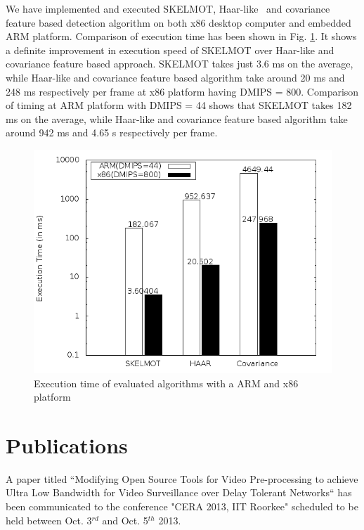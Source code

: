 \documentclass[a4paper, 12pt, twoside]{synopsis}  %
\begin{document}
\indent We have implemented and executed SKELMOT, Haar-like~\cite{17} and
covariance~\cite{19} feature based detection algorithm on both x86
desktop computer and embedded ARM platform. Comparison of execution time
has been shown in Fig.  \ref{pipeline_execution_time}. It shows a
definite improvement in execution speed of SKELMOT over Haar-like and
covariance feature based approach.  SKELMOT takes just 3.6 ms on the
average, while Haar-like and covariance feature based algorithm take
around 20 ms and 248 ms respectively per frame at x86 platform having
DMIPS = 800. Comparison of timing at ARM platform with DMIPS = 44 shows
that SKELMOT takes 182 ms on the average, while Haar-like and covariance
feature based algorithm take around 942 ms and 4.65 s respectively per
frame.  \\
\begin{figure}[!t]
\centering
\includegraphics[scale=0.50]{Figures/pipeline_execution_time}
\caption{Execution time of evaluated algorithms with a ARM and x86
platform}
\label{pipeline_execution_time}
\end{figure}
\section {Publications}
\indent A paper titled ``Modifying Open Source Tools for Video
Pre-processing to achieve Ultra Low Bandwidth for Video Surveillance
over Delay Tolerant Networks`` has been communicated to the conference
"CERA 2013, IIT Roorkee" scheduled to be held between Oct. 3$^{rd}$ and
Oct. 5$^{th}$ 2013.\\
  \clearpage

\label{Bibliography}
%
\end{document}
